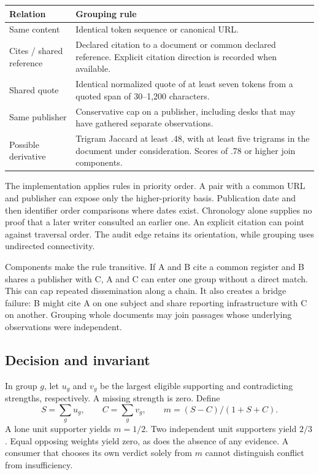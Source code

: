 \begin{center}\small
\begin{tabularx}{\linewidth}{@{}p{.26\linewidth}X@{}}\toprule
Relation & Grouping rule\\\midrule
Same content & Identical token sequence or canonical URL.\\
Cites / shared reference & Declared citation to a document or common declared reference. Explicit citation direction is recorded when available.\\
Shared quote & Identical normalized quote of at least seven tokens from a quoted span of 30--1,200 characters.\\
Same publisher & Conservative cap on a publisher, including desks that may have gathered separate observations.\\
Possible derivative & Trigram Jaccard at least .48, with at least five trigrams in the document under consideration. Scores of .78 or higher join components.\\\bottomrule
\end{tabularx}
\end{center}
The implementation applies rules in priority order. A pair with a common URL and publisher can expose only the higher-priority basis. Publication date and then identifier order comparisons where dates exist. Chronology alone supplies no proof that a later writer consulted an earlier one. An explicit citation can point against traversal order. The audit edge retains its orientation, while grouping uses undirected connectivity.

Components make the rule transitive. If A and B cite a common register and B shares a publisher with C, A and C can enter one group without a direct match. This can cap repeated dissemination along a chain. It also creates a bridge failure: B might cite A on one subject and share reporting infrastructure with C on another. Grouping whole documents may join passages whose underlying observations were independent.

\subsection{Decision and invariant}
In group $g$, let $u_g$ and $v_g$ be the largest eligible supporting and contradicting strengths, respectively. A missing strength is zero. Define
\[
 S=\sum_g u_g,\qquad C=\sum_g v_g,\qquad m=(S-C)/(1+S+C).
\]
A lone unit supporter yields $m=1/2$. Two independent unit supporters yield $2/3$. Equal opposing weights yield zero, as does the absence of any evidence. A consumer that chooses its own verdict solely from $m$ cannot distinguish conflict from insufficiency.

